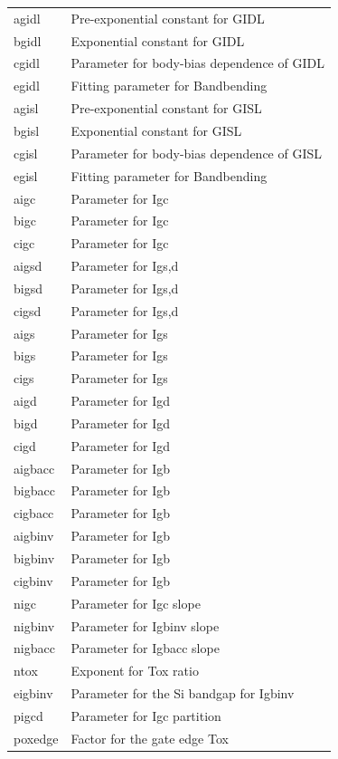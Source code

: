 \begin{longtable}{l l}
{\small agidl} & {\small Pre-exponential constant for GIDL} \\
{\small bgidl} & {\small Exponential constant for GIDL} \\
{\small cgidl} & {\small Parameter for body-bias dependence of GIDL} \\
{\small egidl} & {\small Fitting parameter for Bandbending} \\
{\small agisl} & {\small Pre-exponential constant for GISL} \\
{\small bgisl} & {\small Exponential constant for GISL} \\
{\small cgisl} & {\small Parameter for body-bias dependence of GISL} \\
{\small egisl} & {\small Fitting parameter for Bandbending} \\
{\small aigc} & {\small Parameter for Igc} \\
{\small bigc} & {\small Parameter for Igc} \\
{\small cigc} & {\small Parameter for Igc} \\
{\small aigsd} & {\small Parameter for Igs,d} \\
{\small bigsd} & {\small Parameter for Igs,d} \\
{\small cigsd} & {\small Parameter for Igs,d} \\
{\small aigs} & {\small Parameter for Igs} \\
{\small bigs} & {\small Parameter for Igs} \\
{\small cigs} & {\small Parameter for Igs} \\
{\small aigd} & {\small Parameter for Igd} \\
{\small bigd} & {\small Parameter for Igd} \\
{\small cigd} & {\small Parameter for Igd} \\
{\small aigbacc} & {\small Parameter for Igb} \\
{\small bigbacc} & {\small Parameter for Igb} \\
{\small cigbacc} & {\small Parameter for Igb} \\
{\small aigbinv} & {\small Parameter for Igb} \\
{\small bigbinv} & {\small Parameter for Igb} \\
{\small cigbinv} & {\small Parameter for Igb} \\
{\small nigc} & {\small Parameter for Igc slope} \\
{\small nigbinv} & {\small Parameter for Igbinv slope} \\
{\small nigbacc} & {\small Parameter for Igbacc slope} \\
{\small ntox} & {\small Exponent for Tox ratio} \\
{\small eigbinv} & {\small Parameter for the Si bandgap for Igbinv} \\
{\small pigcd} & {\small Parameter for Igc partition} \\
{\small poxedge} & {\small Factor for the gate edge Tox} \\


\end{longtable}
